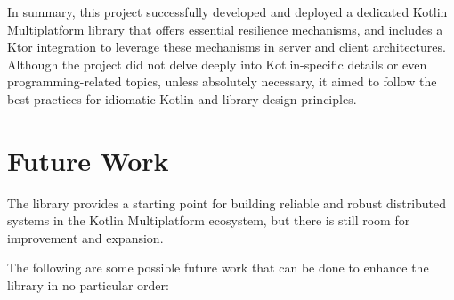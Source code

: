 In summary, this project successfully developed and deployed a dedicated Kotlin Multiplatform library that offers essential resilience mechanisms, and includes a Ktor integration to leverage these mechanisms in server and client architectures.
Although the project did not delve deeply into Kotlin-specific details or even programming-related topics, unless
absolutely necessary, it aimed to follow the best practices for idiomatic Kotlin and library design principles.


\section{Future Work}\label{sec:future-work}

The library provides a starting point for building reliable and robust distributed systems in the Kotlin Multiplatform ecosystem, but there is still room for improvement and expansion.

The following are some possible future work that can be done to enhance the library in no particular order:

